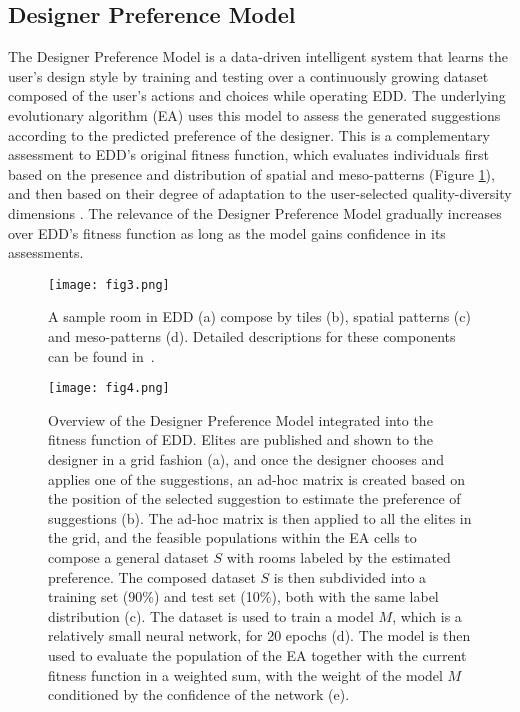 \subsection{Designer Preference Model} \label{p5section/model}

The Designer Preference Model is a data-driven intelligent system that learns the user's design style by training and testing over a continuously growing dataset composed of the user's actions and choices while operating EDD. The underlying evolutionary algorithm (EA) uses this model to assess the generated suggestions according to the predicted preference of the designer. This is a complementary assessment to EDD's original fitness function, which evaluates individuals first based on the presence and distribution of spatial and meso-patterns (Figure \ref{p5fig3}), and then based on their degree of adaptation to the user-selected quality-diversity dimensions . The relevance of the Designer Preference Model gradually increases over EDD's fitness function as long as the model gains confidence in its assessments.

\begin{figure}
\texttt{[image: fig3.png]}
\caption{A sample room in EDD (a) compose by tiles (b), spatial patterns (c) and meso-patterns (d). Detailed descriptions for these components can be found in~\protect{}.} \label{p5fig3}
\end{figure}

\begin{figure}
\texttt{[image: fig4.png]}
\caption{Overview of the Designer Preference Model integrated into the fitness function of EDD. Elites are published and shown to the designer in a grid fashion (a), and once the designer chooses and applies one of the suggestions, an ad-hoc matrix is created based on the position of the selected suggestion to estimate the preference of suggestions (b). The ad-hoc matrix is then applied to all the elites in the grid, and the feasible populations within the EA cells to compose a general dataset $S$ with rooms labeled by the estimated preference. The composed dataset $S$ is then subdivided into a training set (90\%) and test set (10\%), both with the same label distribution (c). The dataset is used to train a model $M$, which is a relatively small neural network, for 20 epochs (d). The  model is then used to evaluate the population of the EA together with the current fitness function in a weighted sum, with the weight of the model $M$ conditioned by the confidence of the network (e).} \label{p5fig4}
\end{figure}

